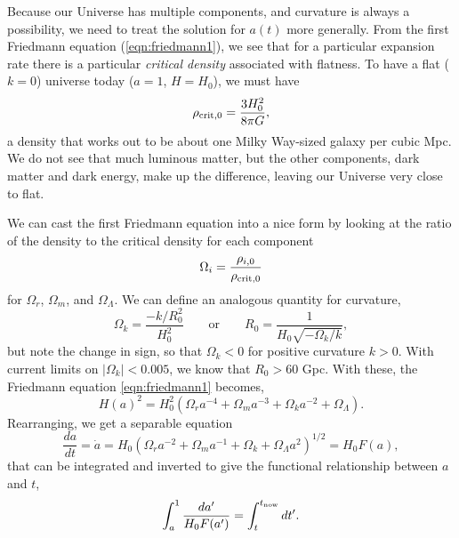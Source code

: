Because our Universe has multiple components, and curvature is always a possibility, we need to treat the solution for $a(t)$ more generally.  From the first Friedmann equation (\ref{eqn:friedmann1}), we see that for a particular expansion rate there is a particular \textit{critical density} associated with flatness.  To have a flat ($k=0$) universe today ($a=1$, $H=H_0$), we must have
\begin{equation}
  \rho_{\rm crit,0}   = \frac{3 H_0^2}{8\pi G},
\end{equation}
a density that works out to be about one Milky Way-sized galaxy per cubic Mpc.  We do not see that much luminous matter, but the other components, dark matter and dark energy, make up the difference, leaving our Universe very close to flat.

We can cast the first Friedmann equation into a nice form by looking at the ratio of the density to the critical density for each component
\begin{equation}
  \Omega_i = \frac{\rho_{i,0}}{\rho_{\rm crit,0}}
\end{equation}
for $\Omega_r$, $\Omega_m$, and $\Omega_\Lambda$.
We can define an analogous quantity for curvature, 
\begin{equation}
  \Omega_k = \frac{-k/R_0^2}{H_0^2}   \qquad \mbox{or} \qquad R_0 = \frac{1}{H_0\sqrt{-\Omega_k / k}},
\end{equation}
but note the change in sign, so that $\Omega_k<0$ for positive curvature $k>0$.  With current limits on $|\Omega_k| < 0.005$, we know that $R_0 > 60$ Gpc.   With these, the Friedmann equation \ref{eqn:friedmann1} becomes,
\begin{equation}
  H(a)^2 = H_0^2 ( \Omega_r a^{-4} + \Omega_m a^{-3} + \Omega_k  a^{-2}+  \Omega_\Lambda ).
\end{equation}
Rearranging, we get a separable equation
\begin{equation}
\frac{da}{dt} = \dot a = H_0 (\Omega_r a^{-2} + \Omega_m a^{-1} + \Omega_k  +  \Omega_\Lambda a^2)^{1/2} = H_0 F(a),
\end{equation}
that can be integrated and inverted to give the functional relationship between $a$ and $t$,
\begin{equation}
  \int^1_a \frac{da'}{H_0 F(a')} =  \int^{t_{\rm now}}_t dt'.
\end{equation}

